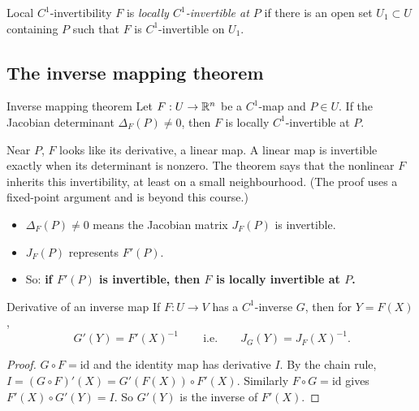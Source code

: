 \begin{definition}{Local $C^1$-invertibility}
$F$ is \emph{locally $C^1$-invertible at $P$} if there is an open set $U_1\subset U$ containing $P$
such that $F$ is $C^1$-invertible on $U_1$.
\end{definition}

\subsection{The inverse mapping theorem}

\begin{theorem}[label=thm:inverse]{Inverse mapping theorem}
Let $F:U\to\mathbb{R}^n$ be a $C^1$-map and $P\in U$. If the Jacobian determinant $\Delta_F(P)\neq0$, then
$F$ is locally $C^1$-invertible at $P$.
\end{theorem}

\begin{intuition}
Near $P$, $F$ looks like its derivative, a linear map. A linear map is invertible exactly when its
determinant is nonzero. The theorem says that the nonlinear $F$ inherits this invertibility, at
least on a small neighbourhood. (The proof uses a fixed-point argument and is beyond this course.)
\end{intuition}

\begin{itemize}
  \item $\Delta_F(P)\neq0$ means the Jacobian matrix $J_F(P)$ is invertible.
  \item $J_F(P)$ represents $F'(P)$.
  \item So: \textbf{if $F'(P)$ is invertible, then $F$ is locally invertible at $P$.}
\end{itemize}

\begin{proposition}{Derivative of an inverse map}
If $F:U\to V$ has a $C^1$-inverse $G$, then for $Y=F(X)$,
\[ \boxed{\,G'(Y)=F'(X)^{-1}\,}\qquad\text{i.e.}\qquad J_G(Y)=J_F(X)^{-1}. \]
\end{proposition}

\begin{proof}
$G\circ F=\mathrm{id}$ and the identity map has derivative $I$. By the chain rule,
$I=(G\circ F)'(X)=G'(F(X))\circ F'(X)$. Similarly $F\circ G=\mathrm{id}$ gives $F'(X)\circ G'(Y)=I$.
So $G'(Y)$ is the inverse of $F'(X)$.
\end{proof}

